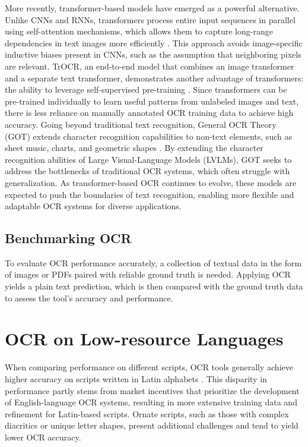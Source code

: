 \documentclass[12pt,oneside]{memoir}
\begin{document}
More recently, transformer-based models have emerged as a powerful alternative.
Unlike CNNs and RNNs, transformers process entire input sequences in parallel using self-attention mechanisms, which allows them to capture long-range dependencies in text images more efficiently \parencite{vaswani-2017}.
This approach avoids image-specific inductive biases present in CNNs, such as the assumption that neighboring pixels are relevant.
TrOCR, an end-to-end model that combines an image transformer and a separate text transformer, demonstrates another advantage of transformers: the ability to leverage self-supervised pre-training \parencite{li-etal-2021}. 
Since transformers can be pre-trained individually to learn useful patterns from unlabeled images and text, there is less reliance on manually annotated OCR training data to achieve high accuracy.
Going beyond traditional text recognition, General OCR Theory (GOT) extends character recognition capabilities to non-text elements, such as sheet music, charts, and geometric shapes \parencite{wei-etal-2024}.
By extending the character recognition abilities of Large Visual-Language Models (LVLMs), GOT seeks to address the bottlenecks of traditional OCR systems, which often struggle with generalization.
As transformer-based OCR continues to evolve, these models are expected to push the boundaries of text recognition, enabling more flexible and adaptable OCR systems for diverse applications.

\subsection{Benchmarking OCR}

To evaluate OCR performance accurately, a collection of textual data in the form of images or PDFs paired with reliable ground truth is needed. 
Applying OCR yields a plain text prediction, which is then compared with the ground truth data to assess the tool’s accuracy and performance.

\section{OCR on Low-resource Languages}

When comparing performance on different scripts, OCR tools generally achieve higher accuracy on scripts written in Latin alphabets \parencite{hegghammer-2022, ignat-etal-2022}.
This disparity in performance partly stems from market incentives that prioritize the development of English-language OCR systems, resulting in more extensive training data and refinement for Latin-based scripts. 
Ornate scripts, such as those with complex diacritics or unique letter shapes, present additional challenges and tend to yield lower OCR accuracy.
\end{document}
